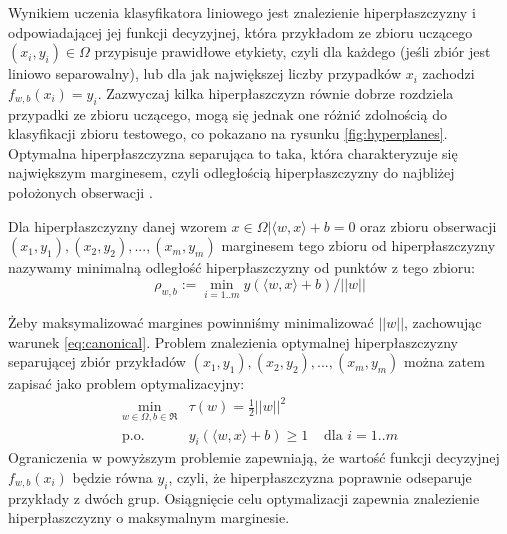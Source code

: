 Wynikiem uczenia klasyfikatora liniowego jest znalezienie hiperpłaszczyzny i odpowiadającej jej funkcji decyzyjnej, która przykładom ze zbioru uczącego $ (x_i, y_i) \in \Omega $ przypisuje prawidłowe etykiety, czyli dla każdego (jeśli zbiór jest liniowo separowalny), lub dla jak największej liczby przypadków $ x_i $ zachodzi  $ f_{w,b}(x_i) = y_i $. Zazwyczaj kilka hiperpłaszczyzn równie dobrze rozdziela przypadki ze zbioru uczącego, mogą się jednak one różnić zdolnością do klasyfikacji zbioru testowego, co pokazano na rysunku \ref{fig:hyperplanes}. Optymalna hiperpłaszczyzna separująca to taka, która charakteryzuje się największym marginesem, czyli odległością hiperpłaszczyzny do najbliżej położonych obserwacji \cite{scholkopf_learning_2002}.
\begin{definicjaa}
Dla hiperpłaszczyzny danej wzorem $ { x \in \Omega | \langle w, x \rangle + b = 0} $ oraz zbioru obserwacji\\
 $ {(x_1, y_1), (x_2, y_2), ..., (x_m, y_m)} $ marginesem tego zbioru od hiperpłaszczyzny nazywamy minimalną odległość hiperpłaszczyzny od punktów z tego zbioru:
	\begin{equation}
	\rho_{w,b} := \min_{i=1..m} y (\langle w, x \rangle + b) / ||w||
	\label{eq:margin}
	\end{equation}
	
\end{definicjaa}
Żeby maksymalizować margines powinniśmy minimalizować $ ||w|| $, zachowując warunek \ref{eq:canonical}. Problem znalezienia optymalnej hiperpłaszczyzny separującej zbiór przykładów  $ {(x_1, y_1), (x_2, y_2), ..., (x_m, y_m)} $ można zatem zapisać jako problem optymalizacyjny:
\begin{equation}
\begin{array}{lll}
\min\limits_{w \in \Omega, b \in \Re} &  \tau(w) = \frac{1}{2}||w||^2 & \\
\text{p.o.} &  y_i  (\langle w, x \rangle + b) \geq 1 & \text{ dla } i=1..m
\end{array}
\label{eq:primal}
\end{equation}
Ograniczenia w powyższym problemie zapewniają, że wartość funkcji decyzyjnej $ f_{w,b}(x_i) $ będzie równa $  y_i $, czyli, że hiperpłaszczyzna poprawnie odseparuje przykłady z dwóch grup. Osiągnięcie celu optymalizacji zapewnia znalezienie hiperpłaszczyzny o maksymalnym marginesie.

